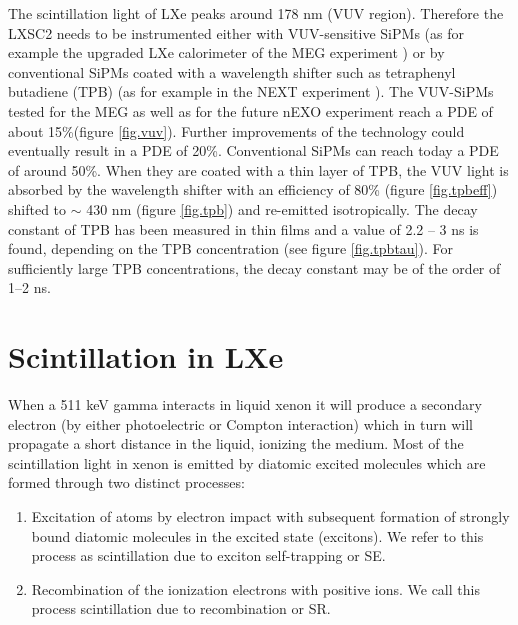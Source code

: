\documentclass[review]{elsarticle}
\begin{document}
The scintillation light of LXe peaks around 178 nm (VUV region). Therefore the LXSC2 needs to be instrumented either with VUV-sensitive SiPMs (as for example the upgraded LXe calorimeter of the 
MEG experiment \cite{Ogawa:2015ucj}) or by conventional SiPMs coated with a wavelength shifter such as tetraphenyl butadiene (TPB) (as for example in the NEXT experiment \cite{Alvarez:2013gxa}). 
The VUV-SiPMs tested for the MEG as well as for the future nEXO 
experiment \cite{Ogawa:2015ucj,Ostrovskiy:2015oja} reach a PDE of about 
15\%(figure \ref{fig.vuv}). Further improvements of the technology could eventually result in a PDE of 20\%.  Conventional SiPMs can reach today a PDE of around 50\%. When they are coated with a thin layer of TPB, the VUV light is absorbed by the wavelength shifter with an efficiency of 80\% \cite{Gehman:2011xm} (figure \ref{fig.tpbeff}) 
shifted to $\sim$ 430 nm (figure \ref{fig.tpb}) and re-emitted isotropically. The decay constant of TPB has been measured  in thin films \cite{TPBtau} and a value of 2.2 -- 3 ns is found, depending on the TPB concentration (see figure \ref{fig.tpbtau}). For sufficiently large TPB concentrations, the decay constant may be of the order of 1--2 ns. 
%

\section{Scintillation in LXe} \label{sec.scint}

When a 511 keV gamma interacts in liquid xenon it will produce a secondary electron (by either photoelectric or Compton interaction) which in turn will propagate a short distance in the liquid, ionizing the medium. Most of the scintillation light in xenon is emitted by diatomic excited molecules which are formed through two distinct processes:
\begin{enumerate}
\item Excitation of atoms by electron impact with subsequent formation of strongly bound diatomic molecules in the excited state (excitons). We refer to this process as scintillation due to exciton self-trapping or SE.
\item Recombination of the ionization electrons with positive ions. We call this process scintillation due to recombination or SR. 
\end{enumerate}
\end{document}
